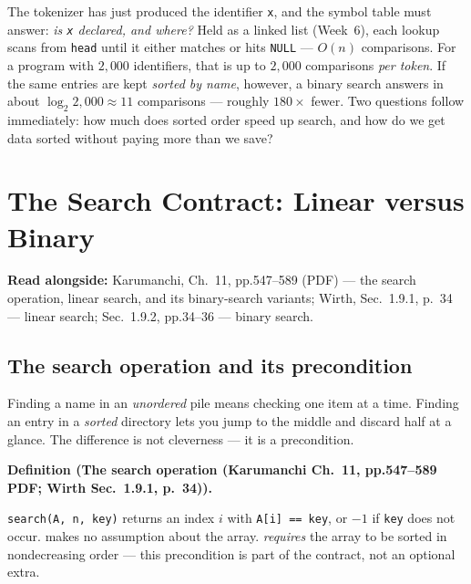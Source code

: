 \documentclass[11pt]{article}
\newenvironment{definitionbox}[1]{%
  \par\noindent\textbf{Definition (#1).}\ \itshape
}{\par\vspace{0.3em}}
\begin{document}
The tokenizer has just produced the identifier \texttt{x}, and the symbol table must answer: \emph{is \texttt{x} declared, and where?} Held as a linked list (Week~6), each lookup scans from \texttt{head} until it either matches or hits \texttt{NULL} --- $O(n)$ comparisons. For a program with $2{,}000$ identifiers, that is up to $2{,}000$ comparisons \emph{per token}. If the same entries are kept \emph{sorted by name}, however, a binary search answers in about $\log_2 2{,}000 \approx 11$ comparisons --- roughly $180\times$ fewer. Two questions follow immediately: how much does sorted order speed up search, and how do we get data sorted without paying more than we save?


\section{The Search Contract: Linear versus Binary}

\textbf{Read alongside:} Karumanchi, Ch.~11, pp.547--589 (PDF) --- the search operation, linear search, and its binary-search variants; Wirth, Sec.~1.9.1, p.~34 --- linear search; Sec.~1.9.2, pp.34--36 --- binary search.

\subsection{The search operation and its precondition}

Finding a name in an \emph{unordered} pile means checking one item at a time. Finding an entry in a \emph{sorted} directory lets you jump to the middle and discard half at a glance. The difference is not cleverness --- it is a precondition.

\begin{definitionbox}{The search operation (Karumanchi Ch.~11, pp.547--589 PDF; Wirth Sec.~1.9.1, p.~34)}
\texttt{search(A, n, key)} returns an index $i$ with \texttt{A[i] == key}, or $-1$ if \texttt{key} does not occur.  makes no assumption about the array.  \emph{requires} the array to be sorted in nondecreasing order --- this precondition is part of the contract, not an optional extra. \cite{Karumanchi2017_data_structures_algorithms_made_easy,Wirth2004_algorithms_data_structures}
\end{definitionbox}
\end{document}
